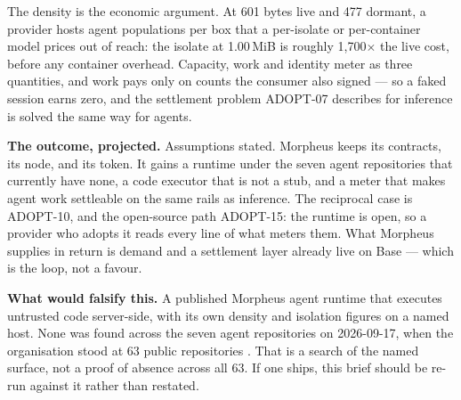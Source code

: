 \documentclass[11pt,a4paper]{article}
\newcommand{\prov}[1]{{\color{muted}\scriptsize\sffamily[#1]}}
\begin{document}
The density is the economic argument. At 601 bytes live and 477 dormant, a provider hosts
agent populations per box that a per-isolate or per-container model prices out of reach: the
isolate at 1.00\,MiB \prov{checked} is roughly 1,700$\times$ the live cost, before any
container overhead. Capacity, work and identity meter as three quantities, and work pays only
on counts the consumer also signed --- so a faked session earns zero, and the settlement
problem ADOPT-07 describes for inference is solved the same way for agents.

\vspace{0.35ex}
\noindent\textbf{The outcome, projected.}
Assumptions stated. Morpheus keeps its contracts, its node, and its token. It gains a runtime
under the seven agent repositories that currently have none, a code executor that is not a
stub, and a meter that makes agent work settleable on the same rails as inference. The
reciprocal case is ADOPT-10, and the open-source path ADOPT-15: the runtime is open, so a provider who adopts it reads every
line of what meters them. What Morpheus supplies in return is demand and a settlement layer
already live on Base --- which is the loop, not a favour.

\vspace{0.35ex}
\noindent\textbf{What would falsify this.}
A published Morpheus agent runtime that executes untrusted code server-side, with its own
density and isolation figures on a named host. None was found across the seven agent
repositories on 2026-09-17, when the organisation stood at 63 public repositories
\prov{verified}. That is a search of the named surface, not a proof of absence across all 63.
If one ships, this brief should be re-run against it rather than restated.
\end{document}
